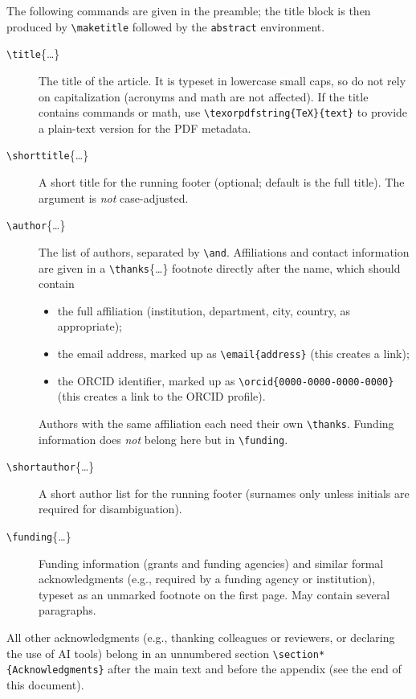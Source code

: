 \documentclass[english,review]{jnsao}
\newcommand{\cs}[1]{\texttt{\textbackslash#1}}
\newcommand{\pkg}[1]{\texttt{#1}}
\begin{document}
The following commands are given in the preamble; the title block is then produced by \cs{maketitle} followed by the \pkg{abstract} environment.

\begin{description}
    \item[\cs{title}\{\dots\}] The title of the article. It is typeset in lowercase small caps, so do not rely on capitalization (acronyms and math are not affected). If the title contains commands or math, use \verb!\texorpdfstring{TeX}{text}! to provide a plain-text version for the PDF metadata.
    \item[\cs{shorttitle}\{\dots\}] A short title for the running footer (optional; default is the full title). The argument is \emph{not} case-adjusted.
    \item[\cs{author}\{\dots\}] The list of authors, separated by \cs{and}. Affiliations and contact information are given in a \cs{thanks}\{\dots\} footnote directly after the name, which should contain
        \begin{itemize}
            \item the full affiliation (institution, department, city, country, as appropriate);
            \item the email address, marked up as \verb!\email{address}! (this creates a link);
            \item the ORCID identifier, marked up as \verb!\orcid{0000-0000-0000-0000}! (this creates a link to the ORCID profile).
        \end{itemize}
        Authors with the same affiliation each need their own \cs{thanks}. Funding information does \emph{not} belong here but in \cs{funding}.
    \item[\cs{shortauthor}\{\dots\}] A short author list for the running footer (surnames only unless initials are required for disambiguation).
    \item[\cs{funding}\{\dots\}] Funding information (grants and funding agencies) and similar formal acknowledgments (e.g., required by a funding agency or institution), typeset as an unmarked footnote on the first page. May contain several paragraphs.
\end{description}
All other acknowledgments (e.g., thanking colleagues or reviewers, or declaring the use of AI tools) belong in an unnumbered section \verb!\section*{Acknowledgments}! after the main text and before the appendix (see the end of this document).
\end{document}
